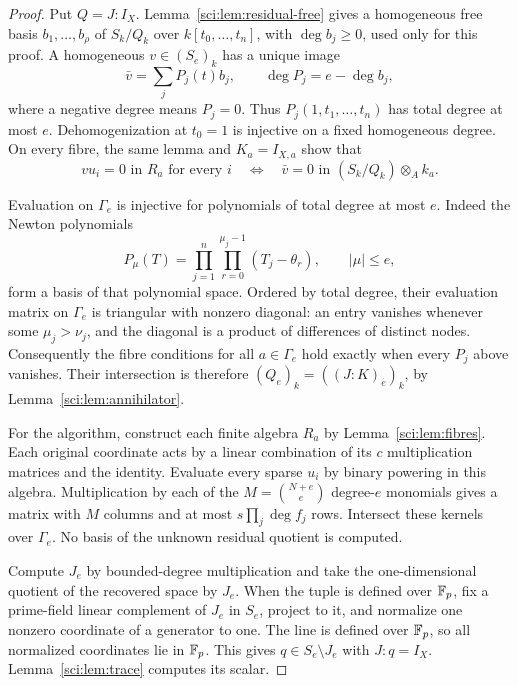 \begin{proof}
Put \(Q=J:I_X\). Lemma~\ref{sci:lem:residual-free} gives a
homogeneous free basis \(b_1,\ldots,b_\rho\) of \(S_k/Q_k\) over
\(k[t_0,\ldots,t_n]\), with \(\deg b_j\geq0\), used only
for this proof. A homogeneous \(v\in(S_e)_k\) has a unique image
\[
 \bar v=\sum_j P_j(t)b_j,
 \qquad \deg P_j=e-\deg b_j,
\]
where a negative degree means \(P_j=0\). Thus
\(P_j(1,t_1,\ldots,t_n)\) has total degree at most \(e\).
Dehomogenization at \(t_0=1\) is injective on a fixed homogeneous
degree. On every fibre, the same lemma and \(K_a=I_{X,a}\) show that
\[
 v u_i=0\text{ in }R_a\text{ for every }i
 \quad\Longleftrightarrow\quad
 \bar v=0\text{ in }(S_k/Q_k)\otimes_A k_a.
\]

Evaluation on \(\Gamma_e\) is injective for polynomials of total
degree at most \(e\). Indeed the Newton polynomials
\[
 P_\mu(T)=\prod_{j=1}^n\prod_{r=0}^{\mu_j-1}(T_j-\theta_r),
 \qquad |\mu|\leq e,
\]
form a basis of that polynomial space. Ordered by total degree, their
evaluation matrix on \(\Gamma_e\) is triangular with nonzero diagonal:
an entry vanishes whenever some \(\mu_j>\nu_j\), and the diagonal
is a product of differences of distinct nodes. Consequently the fibre
conditions for all \(a\in\Gamma_e\) hold exactly when every
\(P_j\) above vanishes. Their intersection is therefore
\((Q_e)_k=((J:K)_e)_k\), by Lemma~\ref{sci:lem:annihilator}.

For the algorithm, construct each finite algebra \(R_a\) by
Lemma~\ref{sci:lem:fibres}. Each original coordinate acts by a linear
combination of its \(c\) multiplication matrices and the identity.
Evaluate every sparse \(u_i\) by binary powering in this algebra.
Multiplication by each of the \(M=\binom{N+e}{e}\) degree-\(e\)
monomials gives a matrix with \(M\) columns and at most
\(s\prod_j\deg f_j\) rows. Intersect these kernels over
\(\Gamma_e\). No basis of the unknown residual quotient is computed.

Compute \(J_e\) by bounded-degree multiplication and take the
one-dimensional quotient of the recovered space by \(J_e\).
When the tuple is defined over \(\mathbb F_p\), fix a prime-field linear
complement of \(J_e\) in \(S_e\), project to it, and normalize
one nonzero coordinate of a generator to one. The line is defined over
\(\mathbb F_p\), so all normalized coordinates lie in \(\mathbb F_p\).
This gives \(q\in S_e\setminus J_e\) with \(J:q=I_X\).
Lemma~\ref{sci:lem:trace} computes its scalar.


\end{proof}
